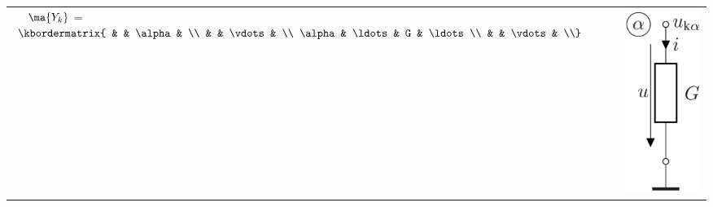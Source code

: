\documentclass[fs, footer]{latex4ei}
\begin{document}
\begin{multicols*}{4}
\begin{tabular}{ll}
		$\ \ \ \ \ma {Y_k}$ =
		$\kbordermatrix{ & & \alpha & \\
		& & \vdots & \\
		\alpha & \ldots & G & \ldots \\
		& & \vdots & \\}$ & \parbox{3cm}{\includegraphics[scale=0.15]{./img/nodevoltageanalysis/conductance_a_gnd.png} }\\
	\end{tabular}


\end{multicols*}
\end{document}
